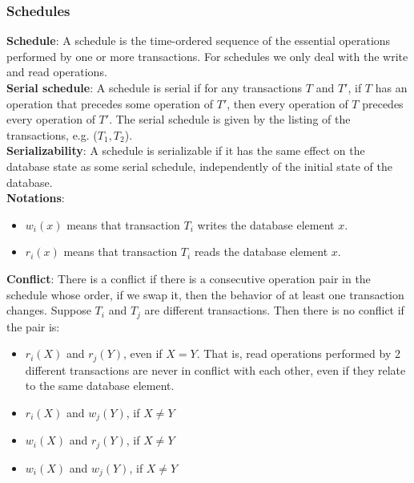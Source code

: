 \documentclass[margin=0px]{article}
\begin{document}
\subsubsection{Schedules}

\noindent \textbf{Schedule}: A schedule is the time-ordered sequence of the essential operations performed by one or more transactions.
For schedules we only deal with the write and read operations.\\

\noindent \textbf{Serial schedule}: A schedule is serial if for any transactions $T$ and $T'$, if $T$ has an operation that
precedes some operation of $T'$, then every operation of $T$ precedes every operation of $T'$. The serial schedule is given by the
listing of the transactions, e.g. ($T_{1},T_{2}$).\\

\noindent \textbf{Serializability}: A schedule is serializable if it has the same effect on the database state
as some serial schedule, independently of the initial state of the database.\\

\noindent \textbf{Notations}:
\begin{itemize}
    \item	$w_{i}(x)$ means that transaction $T_{i}$ writes the database element $x$.
    \item	$r_{i}(x)$ means that transaction $T_{i}$ reads the database element $x$.
\end{itemize}

\noindent \textbf{Conflict}: There is a conflict if there is a consecutive operation pair in the schedule whose order, if we swap it, then the behavior of at least one transaction changes. Suppose $T_{i}$ and $T_{j}$ are different transactions.
Then there is no conflict if the pair is:
\begin{itemize}
    \item	 $r_{i}(X)$ and $r_{j}(Y)$, even if $X = Y$. That is, read operations performed by 2 different transactions
          are never in conflict with each other, even if they relate to the same database element.

    \item	$r_{i}(X)$ and   $w_{j}(Y)$, if $X \not = Y$

    \item	$w_{i}(X)$ and   $r_{j}(Y)$, if $X \not = Y$

    \item	$w_{i}(X)$ and   $w_{j}(Y)$, if $X \not = Y$
\end{itemize}
\end{document}
